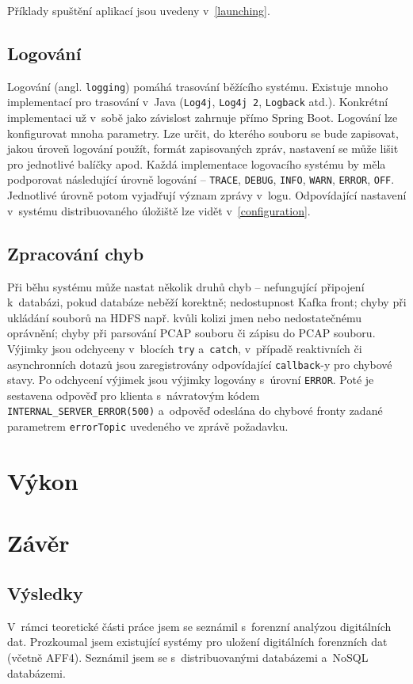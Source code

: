 Příklady spuštění aplikací jsou uvedeny v~\ref{launching}.

\section{Logování}
Logování (angl. \texttt{logging}) pomáhá trasování běžícího systému. Existuje mnoho implementací pro trasování v~Java (\texttt{Log4j}, \texttt{Log4j 2}, \texttt{Logback} atd.). Konkrétní implementaci už v~sobě jako závislost zahrnuje přímo Spring Boot. Logování lze konfigurovat mnoha parametry. Lze určit, do kterého souboru se bude zapisovat, jakou úroveň logování použít, formát zapisovaných zpráv, nastavení se může lišit pro jednotlivé balíčky apod. Každá implementace logovacího systému by měla podporovat následující úrovně logování -- \texttt{TRACE}, \texttt{DEBUG}, \texttt{INFO}, \texttt{WARN}, \texttt{ERROR}, \texttt{OFF}. Jednotlivé úrovně potom vyjadřují význam zprávy v~logu. Odpovídající nastavení v~systému distribuovaného úložiště lze vidět v~\ref{configuration}.

\section{Zpracování chyb}
Při běhu systému může nastat několik druhů chyb -- nefungující připojení k~databázi, pokud databáze neběží korektně; nedostupnost Kafka front; chyby při ukládání souborů na HDFS např. kvůli kolizi jmen nebo nedostatečnému oprávnění; chyby při parsování PCAP souboru či zápisu do PCAP souboru. Výjimky jsou odchyceny v~blocích \texttt{try} a~\texttt{catch}, v~případě reaktivních či asynchronních dotazů jsou zaregistrovány odpovídající \texttt{callback}-y pro chybové stavy. Po odchycení výjimek jsou výjimky logovány s~úrovní \texttt{ERROR}. Poté je sestavena odpověď pro klienta s~návratovým kódem \texttt{INTERNAL\_SERVER\_ERROR(500)} a~odpověď odeslána do chybové fronty zadané parametrem \texttt{errorTopic} uvedeného ve zprávě požadavku.

\chapter{Výkon} \label{chapter_performance}

\chapter{Závěr}

\section{Výsledky}
V~rámci teoretické části práce jsem se seznámil s~forenzní analýzou digitálních dat. Prozkoumal jsem existující systémy pro uložení digitálních forenzních dat (včetně AFF4). Seznámil jsem se s~distribuovanými databázemi a~NoSQL databázemi.

